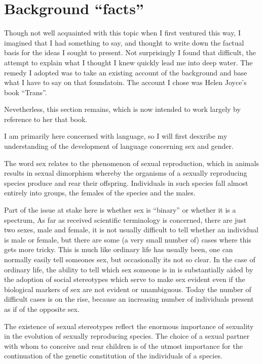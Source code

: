 \documentclass[10pt,titlepage]{article}
\begin{document}
\section{Background ``facts''}

Though not well acquainted with this topic when I first ventured this way, I imagined that I had something to say, and thought to write down the factual basis for the ideas I sought to present.
Not surprisingly I found that difficult, the attempt to explain what I thought I knew quickly lead me into deep water.
The remedy I adopted was to take an existing account of the background and base what I have to say on that foundatoin.
The account I chose was Helen Joyce's book ``Trans''\cite{joyce2021}.

Nevetherless, this section remains, which is now intended to work largely by reference to her that book.

I am primarily here concerned with language, so I will first desxribe my understanding of the development of language concerning sex and gender.

The word sex relates to the phenomenon of sexual reproduction, which in animals results in sexual dimorphism whereby the organisms of a sexually reproducing species produce and rear their offspring.
Individuals in such species fall almost entirely into groups, the females of the species and the males.

Part of the issue at stake here is whether sex is ``binary'' or whether it is a spectrum,
As far as received scientific terminology is concerned, there are just two sexes, male and female, it is not usually difficult to tell whether an individual is male or female, but there are some (a very small number of) cases where this gets more tricky.
This is much like ordinary life has usually been, one can normally easily tell someones sex, but occasionally its not so clear.
In the case of ordinary life, the ability to tell which sex someone is in is substantially aided by the adoption of social stereotypes which serve to make sex evident even if the biological markers of sex are not evident or unambiguous.
Today the number of difficult cases is on the rise, because an increasing number of individuals present as if of the opposite sex.

The existence of sexual stereotypes reflect the enormous importance of sexuality in the evolution of sexually reproducing species.
The choice of a sexual partner with whom to conceive and rear children is of the utmost importance for the continuation of the genetic constitution of the individuals of a species.
\end{document}
